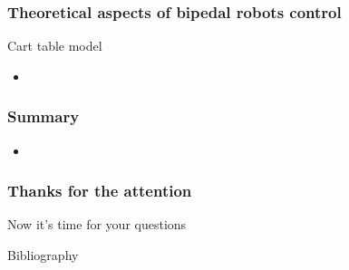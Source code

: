 \documentclass{beamer}
\begin{document}

	\begin{frame}
		\frametitle{Theoretical aspects of bipedal robots control}
		\begin{block}{Cart table model}
			\begin{itemize}
				\item
			\end{itemize}
		\end{block}
		
		\begin{figure}[h!]
			\begin{minipage}[H]{\linewidth}
			\end{minipage}
		\end{figure}
	\end{frame}


	\begin{frame}
		\frametitle{Summary}
		\begin{itemize}
			\item 
		\end{itemize}
	\end{frame}


	\begin{frame}
		\frametitle{Thanks for the attention}
		Now it's time for your questions
		\begin{figure}[h]
		\end{figure}
	\end{frame}
	
	
	\centering
	Bibliography
	
	
		
\end{document}

